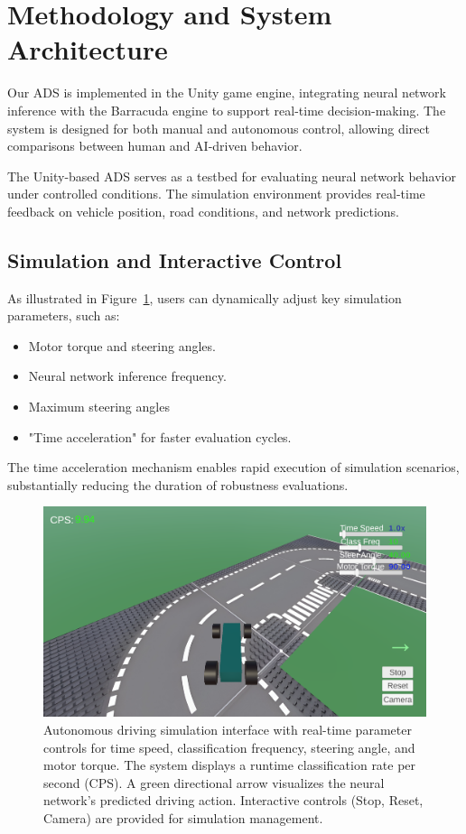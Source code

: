 
\section{Methodology and System Architecture}
Our ADS is implemented in the Unity game engine, integrating neural network inference with the Barracuda engine to support real-time decision-making. The system is designed for both manual and autonomous control, allowing direct comparisons between human and AI-driven behavior.

The Unity-based ADS serves as a testbed for evaluating neural network behavior under controlled conditions. The simulation environment provides real-time feedback on vehicle position, road conditions, and network predictions.


\subsection{Simulation and Interactive Control}
\label{sec:methodologycontrol}
As illustrated in Figure~\ref{fig:simulation_ui}, users can dynamically adjust key simulation parameters, such as:
\begin{itemize}
    \item Motor torque and steering angles.
    \item Neural network inference frequency.
    \item Maximum steering angles
    \item "Time acceleration" for faster evaluation cycles.
\end{itemize}  
The time acceleration mechanism enables rapid execution of simulation scenarios, substantially reducing the duration of robustness evaluations.
\begin{figure}[h]
    \centering
    \includegraphics[width=0.9\linewidth]{figures/image.png}
    \caption{Autonomous driving simulation interface with real-time parameter controls for time speed, classification frequency, steering angle, and motor torque. The system displays a runtime classification rate per second (CPS). A green directional arrow visualizes the neural network's predicted driving action. Interactive controls (Stop, Reset, Camera) are provided for simulation management.}

    \label{fig:simulation_ui}
  \end{figure}



